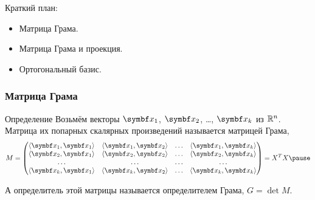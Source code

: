 
\begin{frame} %


\end{frame}



\begin{frame}{Краткий план:}
  \begin{itemize}[<+->]
    \item Матрица Грама.
    \item Матрица Грама и проекция.
    \item Ортогональный базис.
  \end{itemize}

\end{frame}

\begin{frame}
    \frametitle{Матрица Грама}

    \begin{block}{Определение}
        Возьмём векторы $\bx_1$, $\bx_2$, \ldots, $\bx_k$ из $\mathbb{R}^n$. 
        Матрица их попарных скалярных произведений называется \alert{матрицей Грама},
        \[
            M =  \begin{pmatrix}
                \langle \bx_1, \bx_1 \rangle &  \langle \bx_1, \bx_2 \rangle & \ldots & \langle \bx_1, \bx_k \rangle \\
                \langle \bx_2, \bx_1 \rangle &  \langle \bx_2, \bx_2 \rangle & \ldots & \langle \bx_2, \bx_k \rangle \\
                \ldots & \ldots & \ldots & \ldots \\
                \langle \bx_k, \bx_1 \rangle &  \langle \bx_k, \bx_2 \rangle & \ldots & \langle \bx_k, \bx_k \rangle \\ 
            \end{pmatrix} = X^T X\pause
        \]      

        А определитель этой матрицы называется \alert{определителем Грама}, $G=\det M$.
    \end{block}


\end{frame}


